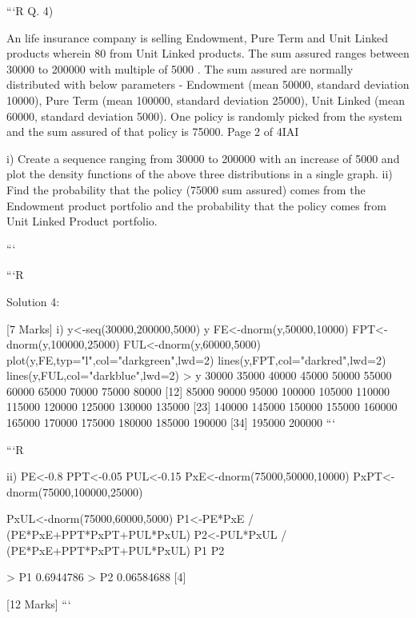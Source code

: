 \documentclass[a4paper,12pt]{article}
\begin{document}
```R
Q. 4)

An life insurance company is selling Endowment, Pure Term and Unit Linked products
wherein 80%
from Unit Linked products. The sum assured ranges between 30000 to 200000 with multiple
of 5000 . The sum assured are normally distributed with below parameters - Endowment
(mean 50000, standard deviation 10000), Pure Term (mean 100000, standard deviation
25000), Unit Linked (mean 60000, standard deviation 5000). One policy is randomly picked
from the system and the sum assured of that policy is 75000.
Page 2 of 4IAI

i)
Create a sequence ranging from 30000 to 200000 with an increase of 5000 and plot the
density functions of the above three distributions in a single graph.
ii) Find the probability that the policy (75000 sum assured) comes from the Endowment
product portfolio and the probability that the policy comes from Unit Linked Product
portfolio.






```


```R

Solution 4:

[7 Marks]
i)
y<-seq(30000,200000,5000)
y
FE<-dnorm(y,50000,10000)
FPT<-dnorm(y,100000,25000)
FUL<-dnorm(y,60000,5000)
plot(y,FE,typ="l",col="darkgreen",lwd=2)
lines(y,FPT,col="darkred",lwd=2)
lines(y,FUL,col="darkblue",lwd=2)
> y
 30000 35000 40000 45000 50000 55000 60000 65000 70000 75000
80000
[12] 85000 90000 95000 100000 105000 110000 115000 120000 125000 130000
135000
[23] 140000 145000 150000 155000 160000 165000 170000 175000 180000 185000
190000
[34] 195000 200000
```


```R

ii)
PE<-0.8
PPT<-0.05
PUL<-0.15
PxE<-dnorm(75000,50000,10000)
PxPT<-dnorm(75000,100000,25000)



PxUL<-dnorm(75000,60000,5000)
P1<-PE*PxE / (PE*PxE+PPT*PxPT+PUL*PxUL)
P2<-PUL*PxUL / (PE*PxE+PPT*PxPT+PUL*PxUL)
P1
P2

> P1
 0.6944786
> P2
 0.06584688
[4]

[12 Marks]
```
\end{document}
